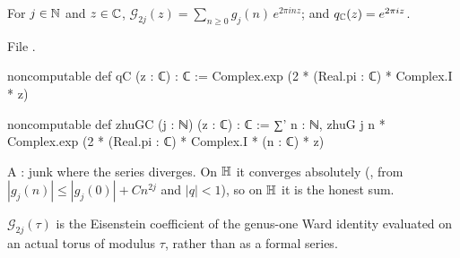 \begin{definition}\label{l14:def:zhuGC}
For $j\in{\mathbb{N}}$ and $z\in{\mathbb{C}}$, $\mathcal G_{2j}(z) = \sum_{n\ge0}g_j(n)\,e^{2\pi inz}$; and $q_{{\mathbb{C}}}(z) = e^{2\pi iz}$.
\end{definition}
\noindent File .
\begin{leancode}
noncomputable def qC (z : ℂ) : ℂ := Complex.exp (2 * (Real.pi : ℂ) * Complex.I * z)

noncomputable def zhuGC (j : ℕ) (z : ℂ) : ℂ :=
  ∑' n : ℕ, zhuG j n * Complex.exp (2 * (Real.pi : ℂ) * Complex.I * (n : ℂ) * z)
\end{leancode}
\begin{dictionary}
A : junk where the series diverges. On $\mathbb{H}$ it converges absolutely
(, from $|g_j(n)|\le|g_j(0)| + Cn^{2j}$ and $|q|<1$), so on $\mathbb{H}$ it is the honest sum.
\end{dictionary}
\begin{physics}
$\mathcal G_{2j}(\tau)$ is the Eisenstein coefficient of the genus-one Ward identity evaluated on an actual torus of modulus $\tau$, rather than as a formal series.
\end{physics}

